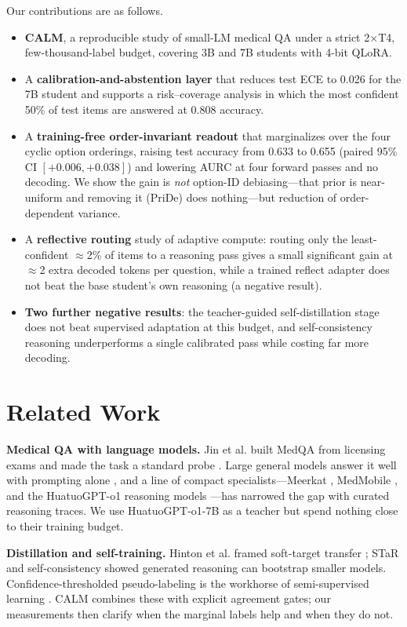 \documentclass[conference]{IEEEtran}
\begin{document}
Our contributions are as follows.
\begin{itemize}
\item \textbf{CALM}, a reproducible study of small-LM medical QA under a strict 2$\times$T4, few-thousand-label budget, covering 3B and 7B students with 4-bit QLoRA.
\item A \textbf{calibration-and-abstention layer} that reduces test ECE to 0.026 for the 7B student and supports a risk--coverage analysis in which the most confident 50\% of test items are answered at 0.808 accuracy.
\item A \textbf{training-free order-invariant readout} that marginalizes over the four cyclic option orderings, raising test accuracy from 0.633 to 0.655 (paired 95\% CI $[+0.006,+0.038]$) and lowering AURC at four forward passes and no decoding. We show the gain is \emph{not} option-ID debiasing---that prior is near-uniform and removing it (PriDe) does nothing---but reduction of order-dependent variance.
\item A \textbf{reflective routing} study of adaptive compute: routing only the least-confident $\approx$2\% of items to a reasoning pass gives a small significant gain at $\approx$2 extra decoded tokens per question, while a trained reflect adapter does not beat the base student's own reasoning (a negative result).
\item \textbf{Two further negative results}: the teacher-guided self-distillation stage does not beat supervised adaptation at this budget, and self-consistency reasoning underperforms a single calibrated pass while costing far more decoding.
\end{itemize}

\section{Related Work}
\textbf{Medical QA with language models.} Jin et al. built MedQA from licensing exams and made the task a standard probe \cite{medqa}. Large general models answer it well with prompting alone \cite{gpt4med,medpalm}, and a line of compact specialists---Meerkat \cite{meerkat}, MedMobile \cite{medmobile}, and the HuatuoGPT-o1 reasoning models \cite{huatuo}---has narrowed the gap with curated reasoning traces. We use HuatuoGPT-o1-7B as a teacher but spend nothing close to their training budget.

\textbf{Distillation and self-training.} Hinton et al. framed soft-target transfer \cite{hinton}; STaR \cite{star} and self-consistency \cite{selfconsistency} showed generated reasoning can bootstrap smaller models. Confidence-thresholded pseudo-labeling is the workhorse of semi-supervised learning \cite{pseudolabel}. CALM combines these with explicit agreement gates; our measurements then clarify when the marginal labels help and when they do not.
\end{document}
